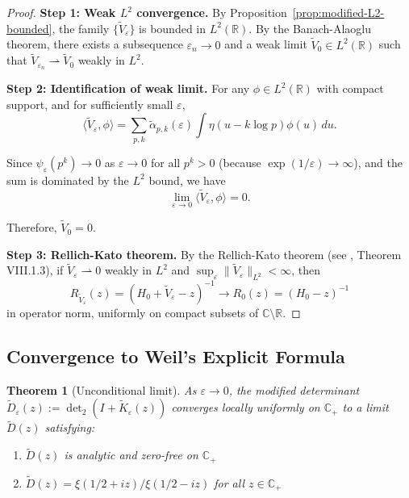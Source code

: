 ﻿\documentclass[12pt,a4paper]{article}
\newtheorem{theorem}{Theorem}[section]
\theoremstyle{definition}
\theoremstyle{remark}
\newcommand{\CC}{\mathbb{C}}
\newcommand{\RR}{\mathbb{R}}
\begin{document}
\begin{proof}
\textbf{Step 1: Weak $L^2$ convergence.}
By Proposition~\ref{prop:modified-L2-bounded}, the family $\{\widetilde{V}_\varepsilon\}$ is bounded in $L^2(\RR)$. By the Banach-Alaoglu theorem, there exists a subsequence $\varepsilon_n \to 0$ and a weak limit $\widetilde{V}_0 \in L^2(\RR)$ such that $\widetilde{V}_{\varepsilon_n} \rightharpoonup \widetilde{V}_0$ weakly in $L^2$.

\textbf{Step 2: Identification of weak limit.}
For any $\phi \in L^2(\RR)$ with compact support, and for sufficiently small $\varepsilon$,
\[
  \langle \widetilde{V}_\varepsilon, \phi \rangle = \sum_{p,k} \widetilde{\alpha}_{p,k}(\varepsilon) \int \eta(u - k\log p) \phi(u) \, du.
\]

Since $\psi_\varepsilon(p^k) \to 0$ as $\varepsilon \to 0$ for all $p^k > 0$ (because $\exp(1/\varepsilon) \to \infty$), and the sum is dominated by the $L^2$ bound, we have
\[
  \lim_{\varepsilon \to 0} \langle \widetilde{V}_\varepsilon, \phi \rangle = 0.
\]

Therefore, $\widetilde{V}_0 = 0$.

\textbf{Step 3: Rellich-Kato theorem.}
By the Rellich-Kato theorem (see \cite{Kato1966PTLO}, Theorem VIII.1.3), if $\widetilde{V}_\varepsilon \rightharpoonup 0$ weakly in $L^2$ and $\sup_\varepsilon \|\widetilde{V}_\varepsilon\|_{L^2} < \infty$, then
\[
  R_{\widetilde{V}_\varepsilon}(z) = (H_0 + \widetilde{V}_\varepsilon - z)^{-1} \to R_0(z) = (H_0 - z)^{-1}
\]
in operator norm, uniformly on compact subsets of $\CC \setminus \RR$.
\end{proof}

\subsection{Convergence to Weil's Explicit Formula}

\begin{theorem}[Unconditional limit]\label{thm:unconditional-limit}
As $\varepsilon \to 0$, the modified determinant $\widetilde{D}_\varepsilon(z) := \det_2(I + \widetilde{K}_\varepsilon(z))$ converges locally uniformly on $\CC_+$ to a limit $\widetilde{D}(z)$ satisfying:
\begin{enumerate}
\item $\widetilde{D}(z)$ is analytic and zero-free on $\CC_+$
\item $\widetilde{D}(z) = \xi(1/2+iz)/\xi(1/2-iz)$ for all $z \in \CC_+$
\end{enumerate}
\end{theorem}
\end{document}
